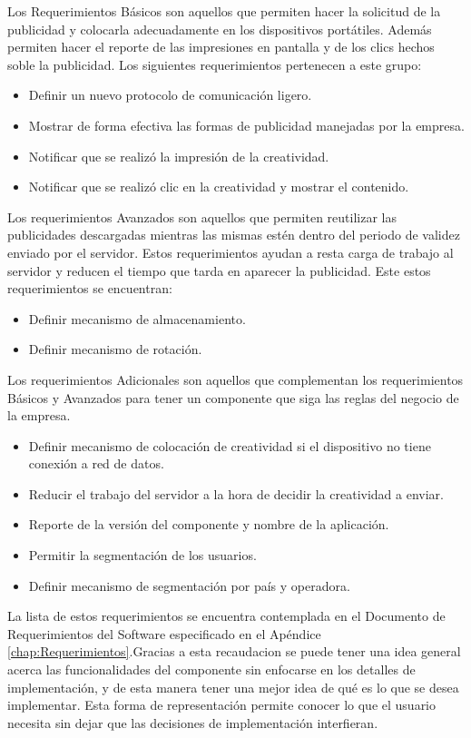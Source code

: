 Los Requerimientos Básicos son aquellos que permiten hacer la solicitud
de la publicidad y colocarla adecuadamente en los dispositivos portátiles.
Además permiten hacer el reporte de las impresiones en pantalla y
de los clics hechos soble la publicidad. Los siguientes requerimientos
pertenecen a este grupo:
\begin{itemize}
\item Definir un nuevo protocolo de comunicación ligero.
\item Mostrar de forma efectiva las formas de publicidad manejadas por la
empresa.
\item Notificar que se realizó la impresión de la creatividad.
\item Notificar que se realizó clic en la creatividad y mostrar el contenido.
\end{itemize}
Los requerimientos Avanzados son aquellos que permiten reutilizar
las publicidades descargadas mientras las mismas estén dentro del
periodo de validez enviado por el servidor. Estos requerimientos ayudan
a resta carga de trabajo al servidor y reducen el tiempo que tarda
en aparecer la publicidad. Este estos requerimientos se encuentran:
\begin{itemize}
\item Definir mecanismo de almacenamiento.
\item Definir mecanismo de rotación.
\end{itemize}
Los requerimientos Adicionales son aquellos que complementan los requerimientos
Básicos y Avanzados para tener un componente que siga las reglas del
negocio de la empresa.
\begin{itemize}
\item Definir mecanismo de colocación de creatividad si el dispositivo no
tiene conexión a red de datos.
\item Reducir el trabajo del servidor a la hora de decidir la creatividad
a enviar.
\item Reporte de la versión del componente y nombre de la aplicación.
\item Permitir la segmentación de los usuarios.
\item Definir mecanismo de segmentación por país y operadora.
\end{itemize}
La lista de estos requerimientos se encuentra contemplada en el Documento
de Requerimientos del Software especificado en el Apéndice \ref{chap:Requerimientos}.Gracias
a esta recaudacion se puede tener una idea general acerca las funcionalidades
del componente sin enfocarse en los detalles de implementación, y
de esta manera tener una mejor idea de qué es lo que se desea implementar.
Esta forma de representación permite conocer lo que el usuario necesita
sin dejar que las decisiones de implementación interfieran.


